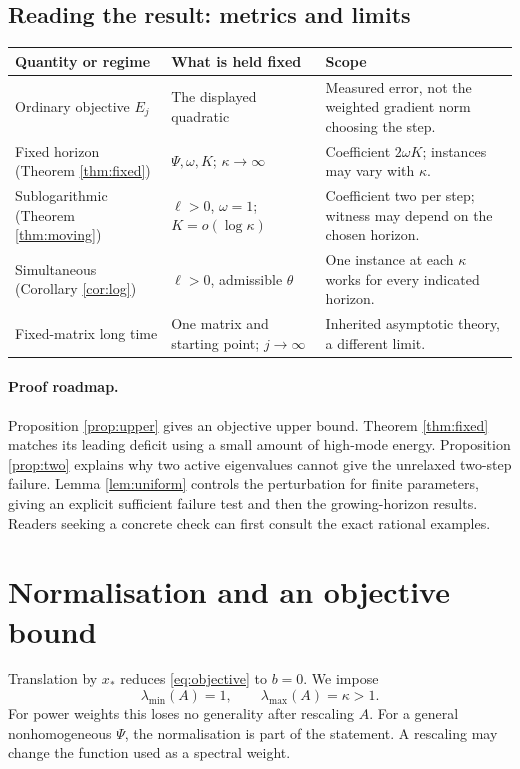 \documentclass[11pt,a4paper]{article}
\theoremstyle{remark}
\begin{document}
\subsection*{Reading the result: metrics and limits}
\begin{center}\small
\begin{tabularx}{\textwidth}{@{}p{}XX@{}}
\toprule
Quantity or regime & What is held fixed & Scope\\
\midrule
Ordinary objective $E_j$ & The displayed quadratic & Measured error, not the weighted gradient norm choosing the step.\\
Fixed horizon (Theorem \ref{thm:fixed}) & $\Psi,\omega,K$; $\kappa\to\infty$ & Coefficient $2\omega K$; instances may vary with $\kappa$.\\
Sublogarithmic (Theorem \ref{thm:moving}) & $\ell>0$, $\omega=1$; $K=o(\log\kappa)$ & Coefficient two per step; witness may depend on the chosen horizon.\\
Simultaneous (Corollary \ref{cor:log}) & $\ell>0$, admissible $\theta$ & One instance at each $\kappa$ works for every indicated horizon.\\
Fixed-matrix long time & One matrix and starting point; $j\to\infty$ & Inherited asymptotic theory, a different limit.\\
\bottomrule
\end{tabularx}
\end{center}
\paragraph{Proof roadmap.}
Proposition \ref{prop:upper} gives an objective upper bound. Theorem \ref{thm:fixed} matches its leading deficit using a small amount of high-mode energy. Proposition \ref{prop:two} explains why two active eigenvalues cannot give the unrelaxed two-step failure. Lemma \ref{lem:uniform} controls the perturbation for finite parameters, giving an explicit sufficient failure test and then the growing-horizon results. Readers seeking a concrete check can first consult the exact rational examples.

\section{Normalisation and an objective bound}

Translation by $x_*$ reduces \eqref{eq:objective} to $b=0$. We impose
\begin{equation}\label{eq:normalise}
 \lambda_{\min}(A)=1,\qquad \lambda_{\max}(A)=\kappa>1.
\end{equation}
For power weights this loses no generality after rescaling $A$. For a general nonhomogeneous $\Psi$, the normalisation is part of the statement. A rescaling may change the function used as a spectral weight.
\end{document}
